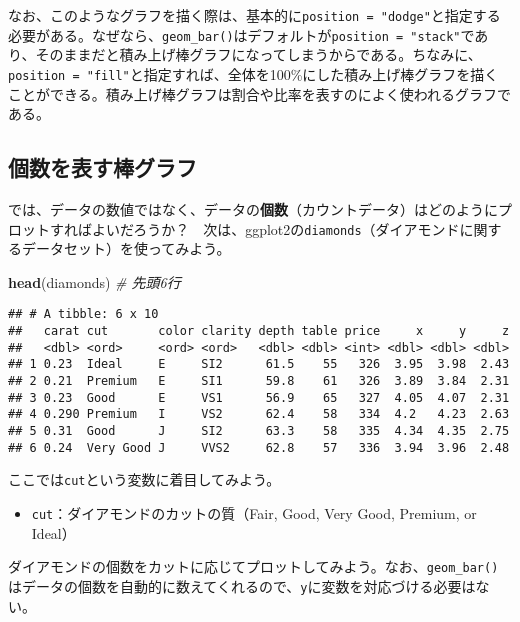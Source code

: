 \documentclass[]{book}
\newenvironment{Shaded}{\begin{snugshade}}{\end{snugshade}}
\newcommand{\KeywordTok}[1]{\textcolor[rgb]{0.13,0.29,0.53}{\textbf{#1}}}
\newcommand{\CommentTok}[1]{\textcolor[rgb]{0.56,0.35,0.01}{\textit{#1}}}
\newcommand{\NormalTok}[1]{#1}
\providecommand{\tightlist}{%
  \setlength{\itemsep}{0pt}\setlength{\parskip}{0pt}}
\begin{document}
なお、このようなグラフを描く際は、基本的に\texttt{position\ =\ "dodge"}と指定する必要がある。なぜなら、\texttt{geom\_bar()}はデフォルトが\texttt{position\ =\ "stack"}であり、そのままだと積み上げ棒グラフになってしまうからである。ちなみに、\texttt{position\ =\ "fill"}と指定すれば、全体を100\%にした積み上げ棒グラフを描くことができる。積み上げ棒グラフは割合や比率を表すのによく使われるグラフである。

\subsection{個数を表す棒グラフ}

では、データの数値ではなく、データの\textbf{個数}（カウントデータ）はどのようにプロットすればよいだろうか？　次は、ggplot2の\texttt{diamonds}（ダイアモンドに関するデータセット）を使ってみよう。

\begin{Shaded}
\begin{Highlighting}[]
\KeywordTok{head}\NormalTok{(diamonds) }\CommentTok{# 先頭6行}
\end{Highlighting}
\end{Shaded}

\begin{verbatim}
## # A tibble: 6 x 10
##   carat cut       color clarity depth table price     x     y     z
##   <dbl> <ord>     <ord> <ord>   <dbl> <dbl> <int> <dbl> <dbl> <dbl>
## 1 0.23  Ideal     E     SI2      61.5    55   326  3.95  3.98  2.43
## 2 0.21  Premium   E     SI1      59.8    61   326  3.89  3.84  2.31
## 3 0.23  Good      E     VS1      56.9    65   327  4.05  4.07  2.31
## 4 0.290 Premium   I     VS2      62.4    58   334  4.2   4.23  2.63
## 5 0.31  Good      J     SI2      63.3    58   335  4.34  4.35  2.75
## 6 0.24  Very Good J     VVS2     62.8    57   336  3.94  3.96  2.48
\end{verbatim}

ここでは\texttt{cut}という変数に着目してみよう。

\begin{itemize}
\tightlist
\item
  \texttt{cut}：ダイアモンドのカットの質（Fair, Good, Very Good,
  Premium, or Ideal）
\end{itemize}

ダイアモンドの個数をカットに応じてプロットしてみよう。なお、\texttt{geom\_bar()}はデータの個数を自動的に数えてくれるので、\texttt{y}に変数を対応づける必要はない。
\end{document}
